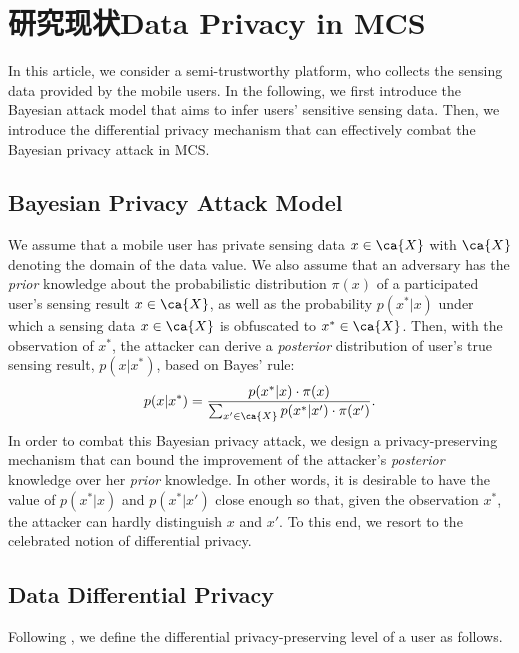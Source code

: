 \section{研究现状Data Privacy in MCS}\label{sec:s2}
In this article, we consider a semi-trustworthy platform, who collects the sensing data provided by the mobile users. In the following, we first introduce the Bayesian attack model that aims to infer users' sensitive sensing data. Then, we introduce the differential privacy mechanism that can effectively combat the Bayesian privacy attack in MCS.

\subsection{Bayesian Privacy Attack Model}
We assume that a mobile user has private sensing data $x\in\ca{X}$ with $\ca{X}$ denoting the domain of the data value. We also assume that an adversary has the \emph{prior} knowledge about the probabilistic distribution $\pi(x)$ of a participated user's sensing result $x\in\ca{X}$, as well as the probability $p(x^*|x)$ under which a sensing data $x\in\ca{X}$ is obfuscated to $x^*\in\ca{X}$. Then, with the observation of $x^*$, the attacker can derive a \emph{posterior} distribution of user's true sensing result, $p(x|x^*)$, based on Bayes' rule\cite{Leye}:
\begin{equation}
p(x|x^*)=\frac{p(x^*|x)\cdot\pi(x)}{\sum_{x'\in\ca{X}}p(x^*|x')\cdot\pi(x')}.
\end{equation}
In order to combat this Bayesian privacy attack, we design a privacy-preserving mechanism that can bound the improvement of the attacker's \emph{posterior} knowledge over her \emph{prior} knowledge. In other words, it is desirable to have the value of $p(x^*|x)$ and $p(x^*|x')$ close enough so that, given the observation $x^*$, the attacker can hardly distinguish $x$ and $x'$. To this end, we resort to the celebrated notion of differential privacy.

\subsection{Data Differential Privacy}
Following \cite{wang2016value}, we define the differential privacy-preserving level of a user as follows.

